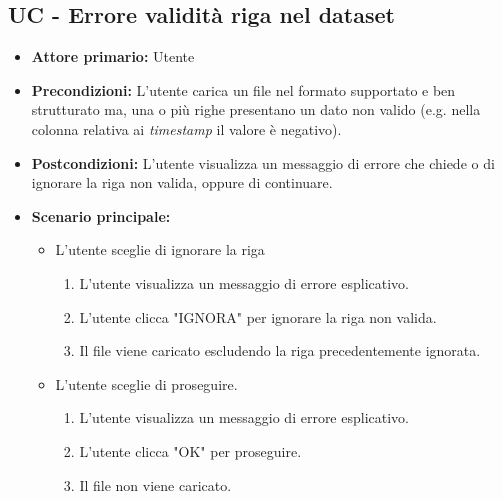 \subsection{UC - Errore validità riga nel dataset}
\label{sec:UC - Errore validità riga}
\begin{itemize}
    \item \textbf{Attore primario:} Utente
    \item \textbf{Precondizioni:} L'utente carica un file nel formato supportato e ben strutturato ma, una o più righe presentano
                                  un dato non valido (e.g. nella colonna relativa ai \textit{timestamp} il valore è negativo).  
    \item \textbf{Postcondizioni:} L'utente visualizza un messaggio di errore che chiede o di ignorare la riga non valida, 
                                   oppure di continuare.
    \item \textbf{Scenario principale:}
    \begin{itemize}
        \item   L'utente sceglie di ignorare la riga
                \begin{enumerate}
                    \item L'utente visualizza un messaggio di errore esplicativo.
                    \item L'utente clicca "IGNORA" per ignorare la riga non valida.
                    \item Il file viene caricato escludendo la riga precedentemente ignorata.
                \end{enumerate} 
        \item   L'utente sceglie di proseguire.
                \begin{enumerate}
                    \item L'utente visualizza un messaggio di errore esplicativo.
                    \item L'utente clicca "OK" per proseguire.
                    \item Il file non viene caricato.
                \end{enumerate} 
    \end{itemize}
\end{itemize}

